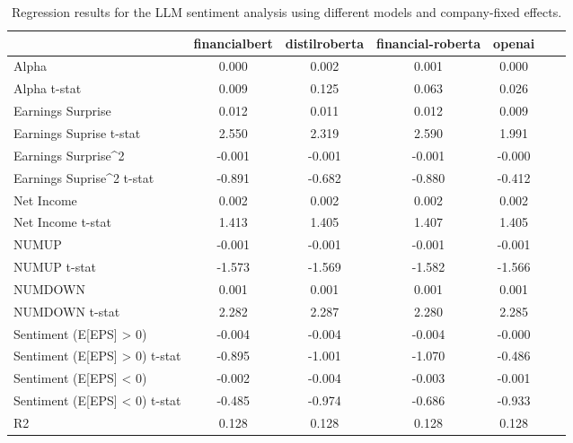 \begin{table}
\caption{Regression results for the LLM sentiment analysis using different models and company-fixed effects.}
\label{tab:llm_regressions_split_company_fixed}
\begin{tabular}{lcccccc}
\toprule
 & financialbert & distilroberta & financial-roberta & openai \\
\midrule
Alpha & 0.000 & 0.002 & 0.001 & 0.000 \\
Alpha t-stat & 0.009 & 0.125 & 0.063 & 0.026 \\
Earnings Surprise & 0.012 & 0.011 & 0.012 & 0.009 \\
Earnings Suprise t-stat & 2.550 & 2.319 & 2.590 & 1.991 \\
Earnings Surprise^2 & -0.001 & -0.001 & -0.001 & -0.000 \\
Earnings Suprise^2 t-stat & -0.891 & -0.682 & -0.880 & -0.412 \\
Net Income & 0.002 & 0.002 & 0.002 & 0.002 \\
Net Income t-stat & 1.413 & 1.405 & 1.407 & 1.405 \\
NUMUP & -0.001 & -0.001 & -0.001 & -0.001 \\
NUMUP t-stat & -1.573 & -1.569 & -1.582 & -1.566 \\
NUMDOWN & 0.001 & 0.001 & 0.001 & 0.001 \\
NUMDOWN t-stat & 2.282 & 2.287 & 2.280 & 2.285 \\
Sentiment (E[EPS] > 0) & -0.004 & -0.004 & -0.004 & -0.000 \\
Sentiment (E[EPS] > 0) t-stat & -0.895 & -1.001 & -1.070 & -0.486 \\
Sentiment (E[EPS] < 0) & -0.002 & -0.004 & -0.003 & -0.001 \\
Sentiment (E[EPS] < 0) t-stat & -0.485 & -0.974 & -0.686 & -0.933 \\
R2 & 0.128 & 0.128 & 0.128 & 0.128 \\
\bottomrule
\end{tabular}
\end{table}
